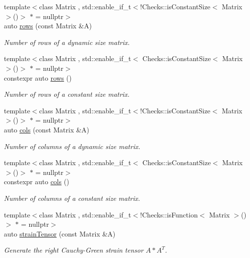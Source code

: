 \begin{DoxyCompactItemize}
{\footnotesize template$<$class Matrix , std\-::enable\-\_\-if\-\_\-t$<$!\-Checks\-::is\-Constant\-Size$<$ Matrix $>$()$>$ $\ast$  = nullptr$>$ }\\auto \hyperlink{namespaceFunG_1_1LinearAlgebra_abd3afa2fcd2194787342b2662cfa9f5a}{rows} (const Matrix \&A)
\begin{DoxyCompactList}\small\item\em Number of rows of a dynamic size matrix. \end{DoxyCompactList}\item 
{\footnotesize template$<$class Matrix , std\-::enable\-\_\-if\-\_\-t$<$ Checks\-::is\-Constant\-Size$<$ Matrix $>$()$>$ $\ast$  = nullptr$>$ }\\constexpr auto \hyperlink{namespaceFunG_1_1LinearAlgebra_ab401cccb1259e724bf37d2e198e2ca3d}{rows} ()
\begin{DoxyCompactList}\small\item\em Number of rows of a constant size matrix. \end{DoxyCompactList}\item 
{\footnotesize template$<$class Matrix , std\-::enable\-\_\-if\-\_\-t$<$!\-Checks\-::is\-Constant\-Size$<$ Matrix $>$()$>$ $\ast$  = nullptr$>$ }\\auto \hyperlink{namespaceFunG_1_1LinearAlgebra_ae981b8bee32eea3ce87f41874835c9c1}{cols} (const Matrix \&A)
\begin{DoxyCompactList}\small\item\em Number of columns of a dynamic size matrix. \end{DoxyCompactList}\item 
{\footnotesize template$<$class Matrix , std\-::enable\-\_\-if\-\_\-t$<$ Checks\-::is\-Constant\-Size$<$ Matrix $>$()$>$ $\ast$  = nullptr$>$ }\\constexpr auto \hyperlink{namespaceFunG_1_1LinearAlgebra_a9eb685419fe4c5f91619d5aa0f973320}{cols} ()
\begin{DoxyCompactList}\small\item\em Number of columns of a constant size matrix. \end{DoxyCompactList}\item 
{\footnotesize template$<$class Matrix , std\-::enable\-\_\-if\-\_\-t$<$!\-Checks\-::is\-Function$<$ Matrix $>$()$>$ $\ast$  = nullptr$>$ }\\auto \hyperlink{namespaceFunG_1_1LinearAlgebra_a0e10030a723fad88f5f4f0b6612c393a}{strain\-Tensor} (const Matrix \&A)
\begin{DoxyCompactList}\small\item\em Generate the right Cauchy-\/\-Green strain tensor $A*A^T$. \end{DoxyCompactList}\item 

\end{DoxyCompactItemize}
